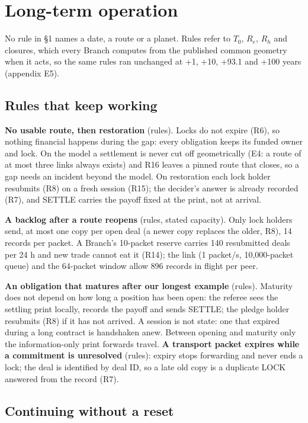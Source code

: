 \section{Long-term operation}\label{sec:long}

No rule in \S1 names a date, a route or a planet. Rules refer to $T_0$, $R_e$, $R_h$ and closures, which every Branch computes from the
published common geometry when it acts, so the same rules ran unchanged at +1, +10, +93.1 and +100 years (appendix E5).

\subsection{Rules that keep working}

\textbf{No usable route, then restoration} (rules). Locks do not expire (R6), so nothing financial happens during the gap: every obligation
keeps its funded owner and lock. On the model a settlement is never cut off geometrically (E4: a route of at most three links always exists)
and R16 leaves a pinned route that closes, so a gap needs an incident beyond the model. On restoration each lock holder resubmits (R8) on a
fresh session (R15); the decider's answer is already recorded (R7), and SETTLE carries the payoff fixed at the print, not at arrival.

\textbf{A backlog after a route reopens} (rules, stated capacity). Only lock holders send, at most one copy per open deal (a newer copy
replaces the older, R8), 14 records per packet. A Branch's 10-packet reserve carries 140 resubmitted deals per 24 h and new trade cannot eat it
(R14); the link (1 packet/s, 10{,}000-packet queue) and the 64-packet window allow 896 records in flight per peer.

\textbf{An obligation that matures after our longest example} (rules). Maturity does not depend on how long a position has been open: the
referee sees the settling print locally, records the payoff and sends SETTLE; the pledge holder resubmits (R8) if it has not arrived. A session is
not state: one that expired during a long contract is handshaken anew. Between opening and maturity only the information-only print forwards travel.
\textbf{A transport packet expires while a commitment is unresolved} (rules): expiry stops forwarding and never ends a lock; the deal is
identified by deal ID, so a late old copy is a duplicate LOCK answered from the record (R7).

\subsection{Continuing without a reset}

